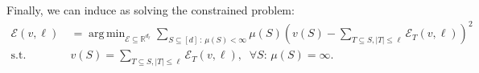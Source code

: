 \documentclass[10pt]{beamer}
\newcommand{\f}{v}
\newcommand{\ex}{\Expl}
\def\Expl{\mathcal{E}}
\DeclareMathOperator*{\argmin}{arg\,min}
\begin{document}
\begin{frame}
    Finally, we can induce as solving the constrained problem:
    \begin{align*}
    \ex(\f, \ell) \ 
    &= \argmin_{\Expl \subseteq \mathbb{R}^{d_\ell} } \sum_{S \subseteq [d]\,:\, \mu(S) < \infty}  \mu(S) \left( \f(S) - \sum_{T \subseteq S , |T| \leq \ell}\Expl_T(\f,\ell) \right)^2 \nonumber \\
    \text{s.t.} \ & \f(S) = \sum_{T \subseteq S , |T| \leq \ell}\Expl_T(\f,\ell), \;\;\forall S :\, \mu(S) = \infty.
    \label{eqn:constrained_weighted_regresion}
    \tag{10}
    \end{align*}
\end{frame}
\begin{frame}
    
\end{frame}
\begin{frame}
    
\end{frame}
\begin{frame}
    
\end{frame}
\begin{frame}
    
\end{frame}
\begin{frame}
    
\end{frame}







\end{document}
